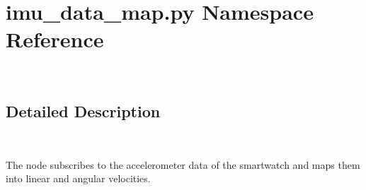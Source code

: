 \hypertarget{namespaceimu__data__map_1_1py}{}\section{imu\+\_\+data\+\_\+map.\+py Namespace Reference}
\label{namespaceimu__data__map_1_1py}


~\newline
 




\subsection{Detailed Description}
~\newline


The node subscribes to the accelerometer data of the smartwatch and maps them into linear and angular velocities. 